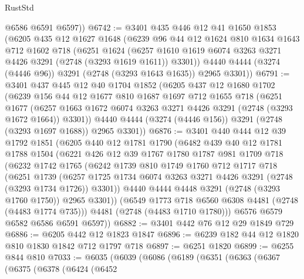 \begin{lexlean}{RustStd}
\begin{coremodule}
        @6586
        @6591
        @6597))
@6742 := @3401
    @435
    @446
    @12
    @41
    @1650
    @1853
    (@6205
      @435
      @12
      @1627
      @1648
      (@6239
        @96
        @44
        @12
        @1624
        @810
        @1634
        @1643
        @712
        @1602
        @718
        (@6251
          @1624
          (@6257 @1610 @1619 @6074 @3263 @3271 @4426 @3291 (@2748 (@3293 @1619 @1611)) @3301))
        @4440
        @4444
        (@3274 (@4446 @96))
        @3291
        (@2748 (@3293 @1643 @1635))
        @2965
        @3301))
@6791 := @3401
    @437
    @445
    @12
    @40
    @1704
    @1852
    (@6205
      @437
      @12
      @1680
      @1702
      (@6239
        @156
        @44
        @12
        @1677
        @810
        @1687
        @1697
        @712
        @1655
        @718
        (@6251
          @1677
          (@6257 @1663 @1672 @6074 @3263 @3271 @4426 @3291 (@2748 (@3293 @1672 @1664)) @3301))
        @4440
        @4444
        (@3274 (@4446 @156))
        @3291
        (@2748 (@3293 @1697 @1688))
        @2965
        @3301))
@6876 := @3401
    @440
    @444
    @12
    @39
    @1792
    @1851
    (@6205
      @440
      @12
      @1781
      @1790
      (@6482
        @439
        @40
        @12
        @1781
        @1788
        @1504
        (@6221
          @426
          @12
          @39
          @1767
          @1780
          @1787
          @981
          @1709
          @718
          (@6232
            @1742
            @1765
            (@6242
              @1739
              @810
              @1749
              @1760
              @712
              @1717
              @718
              (@6251
                @1739
                (@6257 @1725 @1734 @6074 @3263 @3271 @4426 @3291 (@2748 (@3293 @1734 @1726)) @3301))
              @4440
              @4444
              @4448
              @3291
              (@2748 (@3293 @1760 @1750))
              @2965
              @3301))
          (@6549 @1773 @718 @6560 @6308 @4481 (@2748 (@4483 @1774 @735)))
          @4481
          (@2748 (@4483 @1710 @1780)))
        @6576
        @6579
        @6582
        @6586
        @6591
        @6597))
@6882 := @3401 @442 @76 @12 @29 @1849 @729
@6886 := @6205 @442 @12 @1823 @1847
@6896 := @6239 @182 @44 @12 @1820 @810 @1830 @1842 @712 @1797 @718
@6897 := @6251 @1820
@6899 := @6255 @844 @810
@7033 := @6035
    (@6039
      (@6086
        (@6189
          (@6351
            (@6363
              (@6367
                (@6375
                  (@6378
                    (@6424
                      (@6452

\end{coremodule}
\end{lexlean}
